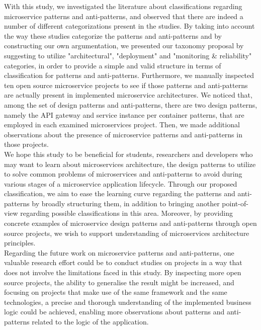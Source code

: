 \documentclass{Configuration_Files/PoliMi3i_thesis}
\begin{document}
With this study, we investigated the literature about classifications regarding microservice patterns and anti-patterns, and observed that there are indeed a number of different categorizations present in the studies.
By taking into account the way these studies categorize the patterns and anti-patterns and by constructing our own argumentation, we presented our taxonomy proposal by suggesting to utilize "architectural", "deployment" and "monitoring \& reliability" categories, in order to provide a simple and valid structure in terms of classification for patterns and anti-patterns.
Furthermore, we manually inspected ten open source microservice projects to see if those patterns and anti-patterns are actually present in implemented microservice architectures.
We noticed that, among the set of design patterns and anti-patterns, there are two design patterns, namely the API gateway and service instance per container patterns, that are employed in each examined microservices project.
Then, we made additional observations about the presence of microservice patterns and anti-patterns in those projects.
\\
We hope this study to be beneficial for students, researchers and developers who may want to learn about microservices architecture, the design patterns to utilize to solve common problems of microservices and anti-patterns to avoid during various stages of a microservice application lifecycle.
Through our proposed classification, we aim to ease the learning curve regarding the patterns and anti-patterns by broadly structuring them, in addition to bringing another point-of-view regarding possible classifications in this area.
Moreover, by providing concrete examples of microservice design patterns and anti-patterns through open source projects, we wish to support understanding of microservices architecture principles.
\\
Regarding the future work on microservice patterns and anti-patterns, one valuable research effort could be to conduct studies on projects in a way that does not involve the limitations faced in this study.
By inspecting more open source projects, the ability to generalise the result might be increased, and focusing on projects that make use of the same framework and the same technologies, a precise and thorough understanding of the implemented business logic could be achieved, enabling more observations about patterns and anti-patterns related to the logic of the application.

\end{document}
